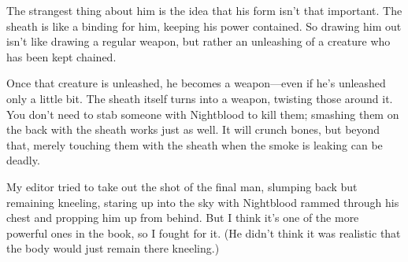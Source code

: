 The strangest thing about him is the idea that his form isn’t that important. The sheath is like a binding for him, keeping his power contained. So drawing him out isn’t like drawing a regular weapon, but rather an unleashing of a creature who has been kept chained.

Once that creature is unleashed, he becomes a weapon—even if he’s unleashed only a little bit. The sheath itself turns into a weapon, twisting those around it. You don’t need to stab someone with Nightblood to kill them; smashing them on the back with the sheath works just as well. It will crunch bones, but beyond that, merely touching them with the sheath when the smoke is leaking can be deadly.

My editor tried to take out the shot of the final man, slumping back but remaining kneeling, staring up into the sky with Nightblood rammed through his chest and propping him up from behind. But I think it’s one of the more powerful ones in the book, so I fought for it. (He didn’t think it was realistic that the body would just remain there kneeling.)



